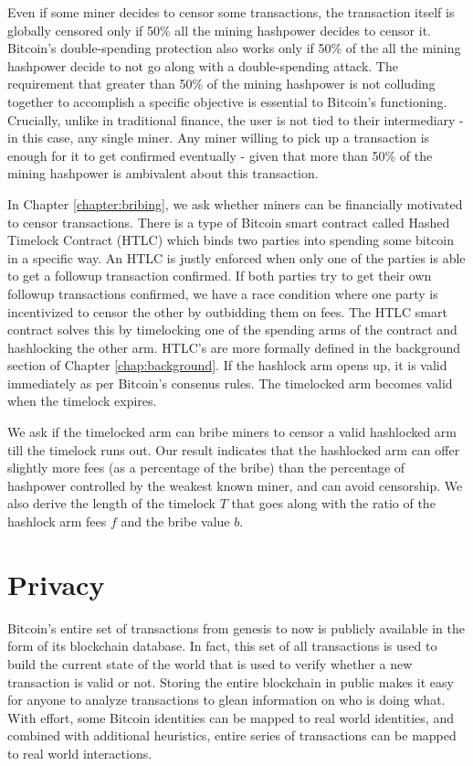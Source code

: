 Even if some miner decides to censor some transactions, the transaction itself is globally censored only if 50\% all the mining hashpower decides to censor it. Bitcoin's double-spending protection also works only if 50\% of the all the mining hashpower decide to not go along with a double-spending attack. The requirement that greater than 50\% of the mining hashpower is not colluding together to accomplish a specific objective is essential to Bitcoin's functioning. Crucially, unlike in traditional finance, the user is not tied to their intermediary - in this case, any single miner. Any miner willing to pick up a transaction is enough for it to get confirmed eventually - given that more than 50\% of the mining hashpower is ambivalent about this transaction.

In Chapter \ref{chapter:bribing}, we ask whether miners can be financially motivated to censor transactions. There is a type of Bitcoin smart contract called Hashed Timelock Contract (HTLC) which binds two parties into spending some bitcoin in a specific way. An HTLC is justly enforced when only one of the parties is able to get a followup transaction confirmed. If both parties try to get their own followup transactions confirmed, we have a race condition where one party is incentivized to censor the other by outbidding them on fees. The HTLC smart contract solves this by timelocking one of the spending arms of the contract and hashlocking the other arm. HTLC's are more formally defined in the background section of Chapter \ref{chap:background}. If the hashlock arm opens up, it is valid immediately as per Bitcoin's consenus rules. The timelocked arm becomes valid when the timelock expires. 

We ask if the timelocked arm can bribe miners to censor a valid hashlocked arm till the timelock runs out. Our result indicates that the hashlocked arm can offer slightly more fees (as a percentage of the bribe) than the percentage of hashpower controlled by the weakest known miner, and can avoid censorship. We also derive the length of the timelock $T$ that goes along with the ratio of the hashlock arm fees $f$ and the bribe value $b$.

\section{Privacy}
Bitcoin's entire set of transactions from genesis to now is publicly available in the form of its blockchain database. In fact, this set of all transactions is used to build the current state of the world that is used to verify whether a new transaction is valid or not. Storing the entire blockchain in public makes it easy for anyone to analyze transactions to glean information on who is doing what. With effort, some Bitcoin identities can be mapped to real world identities, and combined with additional heuristics, entire series of transactions can be mapped to real world interactions.

